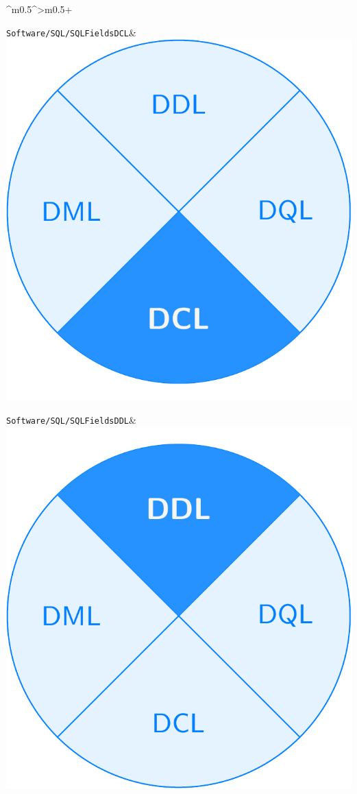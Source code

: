 \documentclass[PLAIN]{Lilly}
\begin{document}
\begin{tabularx}{\linewidth}{^m{0.5\linewidth}^>{\centering\arraybackslash}m{0.5\linewidth}+}
\midrule {} {}\verb|Software/SQL/SQLFieldsDCL|& \includegraphics[width=0.8\linewidth]{Software/SQL/SQLFieldsDCL-pdf.pdf}\\
\midrule {} {}\verb|Software/SQL/SQLFieldsDDL|& \includegraphics[width=0.8\linewidth]{Software/SQL/SQLFieldsDDL-pdf.pdf}\\

\end{tabularx}
\end{document}
